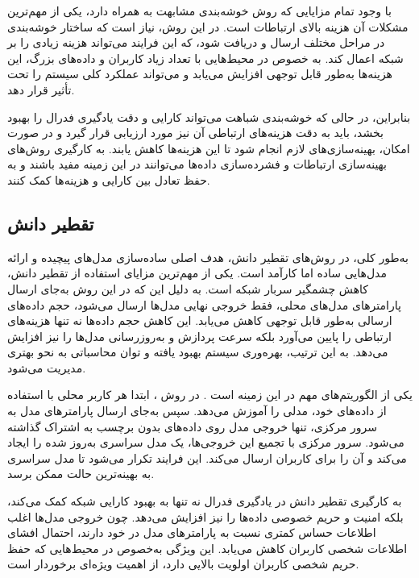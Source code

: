 با وجود تمام مزایایی که روش خوشه‌بندی مشابهت به همراه دارد، یکی از مهم‌ترین مشکلات آن هزینه بالای ارتباطات است. در این روش، نیاز است که ساختار خوشه‌بندی در مراحل مختلف ارسال و دریافت شود، که این فرایند می‌تواند هزینه زیادی را بر شبکه اعمال کند. به خصوص در محیط‌هایی با تعداد زیاد کاربران و داده‌های بزرگ، این هزینه‌ها به‌طور قابل توجهی افزایش می‌یابد و می‌تواند عملکرد کلی سیستم را تحت تأثیر قرار دهد.

بنابراین، در حالی که خوشه‌بندی شباهت می‌تواند کارایی و دقت یادگیری فدرال را بهبود بخشد، باید به دقت هزینه‌های ارتباطی آن نیز مورد ارزیابی قرار گیرد و در صورت امکان، بهینه‌سازی‌های لازم انجام شود تا این هزینه‌ها کاهش یابند. به کارگیری روش‌های بهینه‌سازی ارتباطات و فشرده‌سازی داده‌ها می‌توانند در این زمینه مفید باشند و به حفظ تعادل بین کارایی و هزینه‌ها کمک کنند.


\subsection{
تقطیر دانش%
}
به‌طور کلی، در روش‌های تقطیر دانش، هدف اصلی ساده‌سازی مدل‌های پیچیده و ارائه مدل‌هایی ساده اما کارآمد است.
یکی از مهم‌ترین مزایای استفاده از تقطیر دانش، کاهش چشمگیر سربار شبکه است. به دلیل این که در این روش به‌جای ارسال پارامترهای مدل‌های محلی، فقط خروجی نهایی مدل‌ها ارسال می‌شود، حجم داده‌های ارسالی به‌طور قابل توجهی کاهش می‌یابد. این کاهش حجم داده‌ها نه تنها هزینه‌های ارتباطی را پایین می‌آورد بلکه سرعت پردازش و به‌روزرسانی مدل‌ها را نیز افزایش می‌دهد. به این ترتیب، بهره‌وری سیستم بهبود یافته و توان محاسباتی به نحو بهتری مدیریت می‌شود.

یکی از الگوریتم‌های مهم در این زمینه
%
است
\cite{itahara2021distillation}.
در روش
%
، ابتدا هر کاربر محلی با استفاده از داده‌های خود، مدلی را آموزش می‌دهد. سپس به‌جای ارسال پارامترهای مدل به سرور مرکزی، تنها خروجی مدل روی داده‌های بدون برچسب به اشتراک گذاشته می‌شود. سرور مرکزی با تجمیع این خروجی‌ها، یک مدل سراسری به‌روز شده را ایجاد می‌کند و آن را برای کاربران ارسال می‌کند. این فرایند تکرار می‌شود تا مدل سراسری به بهینه‌ترین حالت ممکن برسد.

به کارگیری تقطیر دانش در یادگیری فدرال نه تنها به بهبود کارایی شبکه کمک می‌کند، بلکه امنیت و حریم خصوصی داده‌ها را نیز افزایش می‌دهد. چون خروجی مدل‌ها اغلب اطلاعات حساس کمتری نسبت به پارامترهای مدل در خود دارند، احتمال افشای اطلاعات شخصی کاربران کاهش می‌یابد. این ویژگی به‌خصوص در محیط‌هایی که حفظ حریم شخصی کاربران اولویت بالایی دارد، از اهمیت ویژه‌ای برخوردار است.

